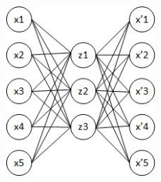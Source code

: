 \documentclass{Bredelebeamer}
\begin{document}
\begin{frame}
\begin{figure}[h!]
	\centering
	\includegraphics[width=0.5\textwidth]{autoencoder_bad_diagram.png}
\end{figure}

\end{frame}
\end{document}
